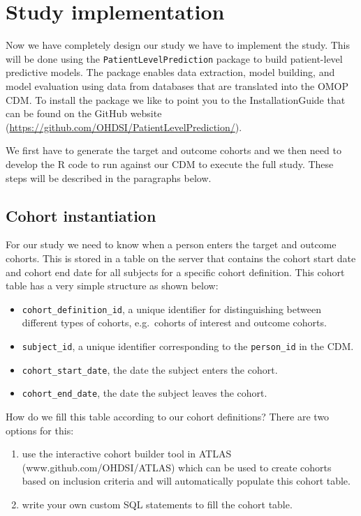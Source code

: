 \documentclass[]{book}
\providecommand{\tightlist}{%
  \setlength{\itemsep}{0pt}\setlength{\parskip}{0pt}}
\begin{document}
\section{Study implementation}\label{study-implementation}

Now we have completely design our study we have to implement the study.
This will be done using the \texttt{PatientLevelPrediction} package to
build patient-level predictive models. The package enables data
extraction, model building, and model evaluation using data from
databases that are translated into the OMOP CDM. To install the package
we like to point you to the InstallationGuide that can be found on the
GitHub website (\url{https://github.com/OHDSI/PatientLevelPrediction/}).

We first have to generate the target and outcome cohorts and we then
need to develop the R code to run against our CDM to execute the full
study. These steps will be described in the paragraphs below.

\subsection{Cohort instantiation}\label{cohort-instantiation}

For our study we need to know when a person enters the target and
outcome cohorts. This is stored in a table on the server that contains
the cohort start date and cohort end date for all subjects for a
specific cohort definition. This cohort table has a very simple
structure as shown below:

\begin{itemize}
\tightlist
\item
  \texttt{cohort\_definition\_id}, a unique identifier for
  distinguishing between different types of cohorts, e.g.~cohorts of
  interest and outcome cohorts.
\item
  \texttt{subject\_id}, a unique identifier corresponding to the
  \texttt{person\_id} in the CDM.
\item
  \texttt{cohort\_start\_date}, the date the subject enters the cohort.
\item
  \texttt{cohort\_end\_date}, the date the subject leaves the cohort.
\end{itemize}

How do we fill this table according to our cohort definitions? There are
two options for this:

\begin{enumerate}
\def\labelenumi{\arabic{enumi})}
\item
  use the interactive cohort builder tool in ATLAS
  (www.github.com/OHDSI/ATLAS) which can be used to create cohorts based
  on inclusion criteria and will automatically populate this cohort
  table.
\item
  write your own custom SQL statements to fill the cohort table.
\end{enumerate}
\end{document}

